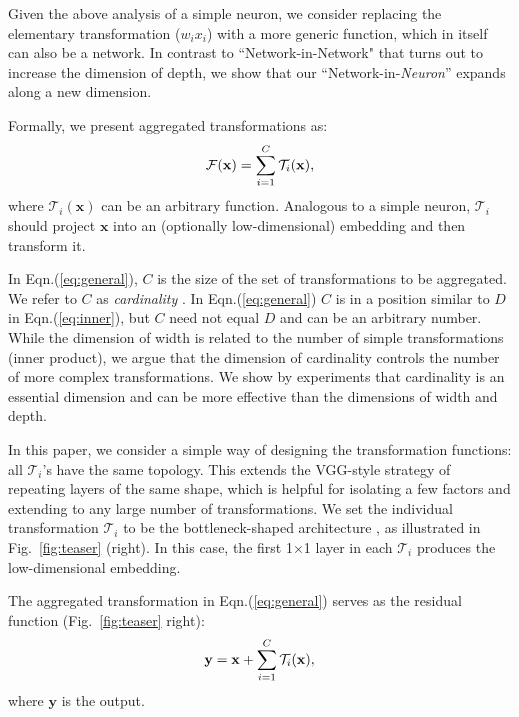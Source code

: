 \documentclass[10pt,twocolumn,letterpaper]{article}
\newcommand{\ve}[1]{\mathbf{#1}} %
\begin{document}
Given the above analysis of a simple neuron, we consider replacing the elementary transformation ($w_i x_i$) with a more generic function, which in itself can also be a network. In contrast to ``Network-in-Network" \cite{Lin2014a} that turns out to increase the dimension of depth, we show that our ``Network-in-\emph{Neuron}'' expands along a new dimension.

Formally, we present aggregated transformations as:
\vspace{-.5em}
\begin{equation}\label{eq:general}
\mathcal{F}(\ve{x})=\sum_{i=1}^{C}\mathcal{T}_i(\ve{x}),
\vspace{-.5em}
\end{equation}
where $\mathcal{T}_i(\ve{x})$ can be an arbitrary function. Analogous to a simple neuron, $\mathcal{T}_i$ should project $\ve{x}$ into an (optionally low-dimensional) embedding and then transform it. 

In Eqn.(\ref{eq:general}), $C$ is the size of the set of transformations to be aggregated. We refer to $C$ as \emph{cardinality} \cite{Cantor1884}.
In Eqn.(\ref{eq:general}) $C$ is in a position similar to $D$ in Eqn.(\ref{eq:inner}), but $C$ need not equal $D$ and can be an arbitrary number. While the dimension of width is related to the number of simple transformations (inner product), we argue that the dimension of cardinality controls the number of more complex transformations. We show by experiments that cardinality is an essential dimension and can be more effective than the dimensions of width and depth.

In this paper, we consider a simple way of designing the transformation functions: all $\mathcal{T}_i$'s have the same topology. This extends the VGG-style strategy of repeating layers of the same shape, which is helpful for isolating a few factors and extending to any large number of transformations. We set the individual transformation $\mathcal{T}_i$ to be the bottleneck-shaped architecture \cite{He2016}, as illustrated in Fig.~\ref{fig:teaser} (right). In this case, the first 1$\times$1 layer in each $\mathcal{T}_i$ produces the low-dimensional embedding.

The aggregated transformation in Eqn.(\ref{eq:general}) serves as the residual function \cite{He2016} (Fig.~\ref{fig:teaser} right):
\vspace{-.5em}
\begin{equation}\label{eq:resnext}
\ve{y}=\ve{x}+\sum_{i=1}^{C}\mathcal{T}_i(\ve{x}),
\vspace{-.5em}
\end{equation}
where $\ve{y}$ is the output.
\end{document}
